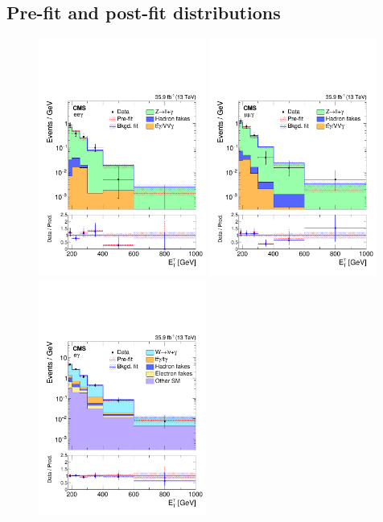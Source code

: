 \subsection{Pre-fit and post-fit distributions}
\label{subsec:distributions}

\begin{figure}[htbp]
  \centering
    \includegraphics[width=0.49\textwidth]{Analysis/Figures/bonly_diel.pdf}
    \includegraphics[width=0.49\textwidth]{Analysis/Figures/bonly_dimu.pdf}
    \includegraphics[width=0.49\textwidth]{Analysis/Figures/bonly_monoel.pdf}

\end{figure}
